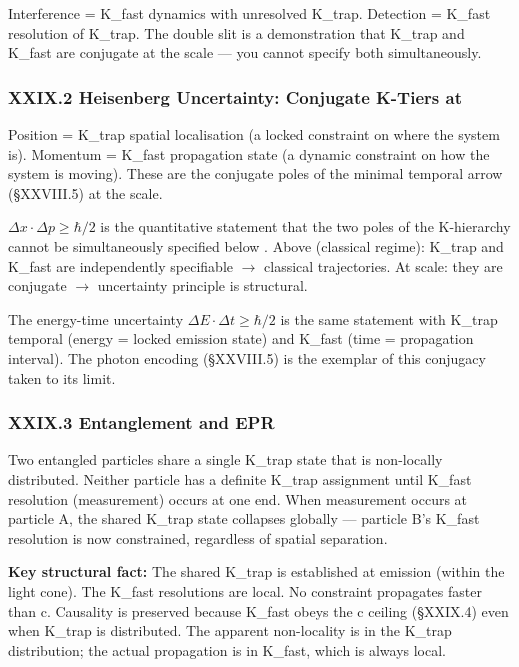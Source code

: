 \documentclass[12pt,a4paper]{article}
\begin{document}
Interference = K\_fast dynamics with unresolved K\_trap. Detection = K\_fast resolution of K\_trap. The double slit is a demonstration that K\_trap and K\_fast are conjugate at the \hbar scale --- you cannot specify both simultaneously.

\subsubsection{XXIX.2 Heisenberg Uncertainty: Conjugate K-Tiers at \hbar}

Position = K\_trap spatial localisation (a locked constraint on where the system is). Momentum = K\_fast propagation state (a dynamic constraint on how the system is moving). These are the conjugate poles of the minimal temporal arrow (§XXVIII.5) at the \hbar scale.

$\Delta x \cdot \Delta p \geq \hbar/2$ is the quantitative statement that the two poles of the K-hierarchy cannot be simultaneously specified below \hbar. Above \hbar (classical regime): K\_trap and K\_fast are independently specifiable $\rightarrow$ classical trajectories. At \hbar scale: they are conjugate $\rightarrow$ uncertainty principle is structural.

The energy-time uncertainty $\Delta E \cdot \Delta t \geq \hbar/2$ is the same statement with K\_trap temporal (energy = locked emission state) and K\_fast (time = propagation interval). The photon encoding (§XXVIII.5) is the exemplar of this conjugacy taken to its limit.

\subsubsection{XXIX.3 Entanglement and EPR}

Two entangled particles share a single K\_trap state that is non-locally distributed. Neither particle has a definite K\_trap assignment until K\_fast resolution (measurement) occurs at one end. When measurement occurs at particle A, the shared K\_trap state collapses globally --- particle B's K\_fast resolution is now constrained, regardless of spatial separation.

\textbf{Key structural fact:} The shared K\_trap is established at emission (within the light cone). The K\_fast resolutions are local. No constraint propagates faster than c. Causality is preserved because K\_fast obeys the c ceiling (§XXIX.4) even when K\_trap is distributed. The apparent non-locality is in the K\_trap distribution; the actual propagation is in K\_fast, which is always local.
\end{document}
